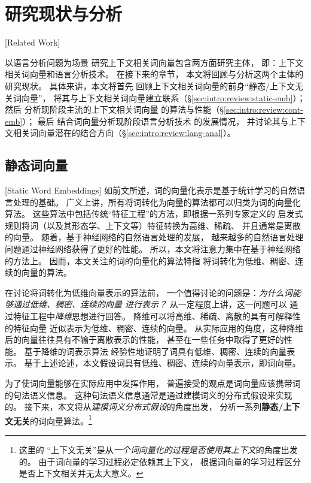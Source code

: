 \section{研究现状与分析}[Related Work]

以语言分析问题为场景
研究上下文相关词向量包含两方面研究主体，
即：上下文相关词向量和语言分析技术。
在接下来的章节，
本文将回顾与分析这两个主体的研究现状。
具体来讲，本文将首先
回顾上下文相关词向量的前身``静态/上下文无关词向量''，
将其与上下文相关词向量建立联系（\S\ref{sec:intro:review:static-emb}）；
然后
分析现阶段主流的上下文相关词向量
的算法与性能（\S\ref{sec:intro:review:cont-emb}）；
最后
结合词向量分析现阶段语言分析技术
的发展情况，
并讨论其与上下文相关词向量潜在的结合方向（\S\ref{sec:intro:review:lang-anal}）。

\subsection{静态词向量}[Static Word Embeddings]\label{sec:intro:review:static-emb}
如前文所述，词的向量化表示是基于统计学习的自然语言处理的基础。
广义上讲，所有将词转化为向量的算法都可以归类为词的向量化算法。
这些算法中包括传统``特征工程''的方法，即根据一系列专家定义的
启发式规则将词（以及其形态学、上下文等）特征转换为高维、稀疏、
并且通常是离散的向量。
随着，基于神经网络的自然语言处理的发展，
越来越多的自然语言处理问题通过神经网络获得了更好的性能。
所以，本文将注意力集中在基于神经网络的方法上。
因而，本文关注的词的向量化的算法特指
将词转化为低维、稠密、连续的向量的算法。

在讨论将词转化为低维向量表示的算法前，
一个值得讨论的问题是：\textit{为什么词能够通过低维、稠密、连续的向量
进行表示？}
从一定程度上讲，这一问题可以
通过特征工程中\textit{降维}思想进行回答。
降维可以将高维、稀疏、离散的具有可解释性的特征向量
近似表示为低维、稠密、连续的向量。
从实际应用的角度，这种降维后的向量往往具有不输于离散表示的性能，
甚至在一些任务中取得了更好的性能。\cite{lei-EtAl:2014:P14-1,lei-EtAl:2015:NAACL-HLT}
基于降维的词表示算法
经验性地证明了词具有低维、稠密、连续的向量表示。
基于上述论述，本文假设词具有低维、稠密、连续的向量表示，即词向量。

为了使词向量能够在实际应用中发挥作用，
普遍接受的观点是词向量应该携带词的句法语义信息。\cite{NIPS2013_5021,faruqui-EtAl:2016:RepEval,7478417}
这种句法语义信息通常是通过建模词义的分布式假设来实现的。
接下来，本文将从\textit{建模词义分布式假设}的角度出发，
分析一系列\textbf{静态/上下文无关}的词向量算法。\footnote{这里的
``上下文无关''是从\textit{一个词向量化的过程是否使用其上下文}的角度出发的。
由于词向量的学习过程必定依赖其上下文，
根据词向量的学习过程区分是否上下文相关并无太大意义。}

